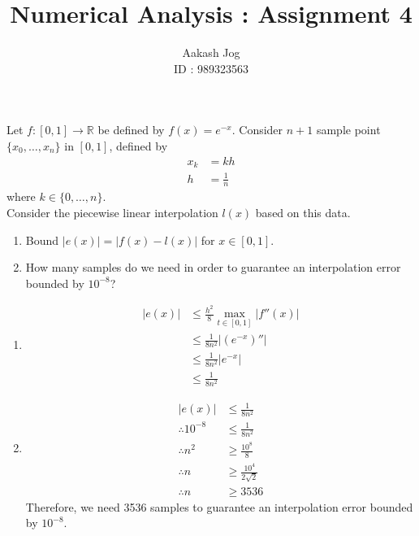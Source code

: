 \documentclass[fleqn, a4paper, 11pt, oneside]{amsart}
\title{Numerical Analysis : Assignment 4}
\author
{
	Aakash Jog\\
	ID : 989323563
}
\date{\formatdate{10}{11}{2015}}
\theoremstyle{definition}
\theoremstyle{theorem}
\begin{document}

\maketitle

\begin{question}
	Let $f : [0,1] \to \mathbb{R}$ be defined by $f(x) = e^{-x}$.
	Consider $n + 1$ sample point $\{x_0,\dots,x_n\}$ in $[0,1]$, defined by
	\begin{align*}
		x_k & = k h \\
		h   & = \frac{1}{n}
	\end{align*}
	where $k \in \{0,\dots,n\}$.\\
	Consider the piecewise linear interpolation $l(x)$ based on this data.
	\begin{enumerate}
		\item Bound $\left| e(x) \right| = \left| f(x) - l(x) \right|$ for $x \in [0,1]$.
		\item How many samples do we need in order to guarantee an interpolation error bounded by $10^{-8}$?
	\end{enumerate}
\end{question}

\begin{solution}
	\begin{enumerate}[leftmargin=*]
		\item
			\begin{align*}
				\left| e(x) \right| & \le \frac{h^2}{8} \max\limits_{t \in [0,1]} \left| f''(x) \right| \\
                                                    & \le \frac{1}{8 n^2} \left| \left( e^{-x} \right)'' \right|        \\
                                                    & \le \frac{1}{8 n^2} \left| e^{-x} \right|                         \\
                                                    & \le \frac{1}{8 n^2}
			\end{align*}
		\item
			\begin{align*}
				\left| e(x) \right| & \le \frac{1}{8 n^2}         \\
				\therefore 10^{-8}  & \le \frac{1}{8 n^2}         \\
				\therefore n^2      & \ge \frac{10^{8}}{8}        \\
				\therefore n        & \ge \frac{10^4}{2 \sqrt{2}} \\
				\therefore n        & \ge 3536
			\end{align*}
			Therefore, we need 3536 samples to guarantee an interpolation error bounded by $10^{-8}$.
	\end{enumerate}
\end{solution}
\end{document}
